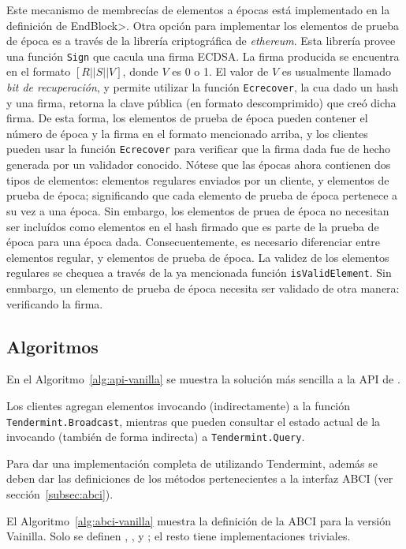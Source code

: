 %
Este mecanismo de membrecías de elementos a épocas está implementado en la definición de
\<EndBlock>.
%
Otra opción para implementar los elementos de prueba de época es a través de la librería
criptográfica de \textit{ethereum}.
%
Esta librería provee una función \texttt{Sign} que cacula una firma ECDSA.
%
La firma producida se encuentra en el formato $[R || S || V]$, donde $V$ es 0 o 1.
%
El valor de $V$ es usualmente llamado \textit{bit de recuperación}, y permite utilizar
la función \texttt{Ecrecover}, la cua dado un hash y una firma, retorna la clave pública
(en formato descomprimido) que creó dicha firma.
%
De esta forma, los elementos de prueba de época pueden contener el número de época y la firma
en el formato mencionado arriba, y los clientes pueden usar la función \texttt{Ecrecover} para
verificar que la firma dada fue de hecho generada por un validador conocido.
%
Nótese que las épocas ahora contienen dos tipos de elementos: elementos regulares enviados por
un cliente, y elementos de prueba de época; significando que cada elemento de prueba de época
pertenece a su vez a una época. Sin embargo, los elementos de pruea de época no necesitan ser
incluídos como elementos en el hash firmado que es parte de la prueba de época para una época
dada.
%
Consecuentemente, es necesario diferenciar entre elementos regular, y elementos de prueba de época.
%
La validez de los elementos regulares se chequea a través de la ya mencionada función
\texttt{isValidElement}.
%
Sin enmbargo, un elemento de prueba de época necesita ser validado de otra manera: verificando la firma.
%

\subsection{Algoritmos}


%
En el Algoritmo~\ref{alg:api-vanilla} se muestra la solución más sencilla a la API
de \setchain.
%

Los clientes agregan elementos invocando (indirectamente) a la función
\texttt{Tendermint.Broadcast}, mientras que pueden consultar el estado actual de
la \setchain invocando (también de forma indirecta) a \texttt{Tendermint.Query}.
%

Para dar una implementación completa de \setchain utilizando Tendermint, además se
deben dar las definiciones de los métodos pertenecientes a la interfaz ABCI
(ver sección~\ref{subsec:abci}). 
%


El Algoritmo~\ref{alg:abci-vanilla} muestra la definición de la ABCI para la versión
Vainilla.
%
Solo se definen \CheckTx, \DeliverTx, y \EndBlock; el resto tiene implementaciones
triviales.

